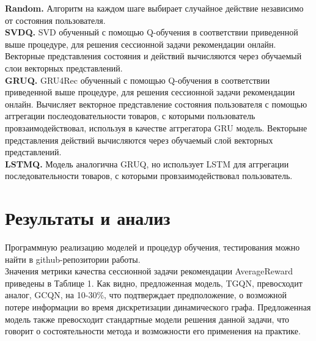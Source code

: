 \documentclass[a4paper,14pt,oneside]{mipt-thesis-ms}
\begin{document}
{\bf Random.} Алгоритм на каждом шаге выбирает случайное действие независимо от состояния пользователя.\\

{\bf SVDQ\cite{zhang01}.} SVD обученный с помощью Q-обучения в соответствии приведенной выше процедуре, для решения сессионной задачи рекомендации онлайн. Векторные представления состояния и действий вычисляются через обучаемый слои векторных представлений.\\

{\bf GRUQ\cite{hidasi01}.} GRU4Rec обученный с помощью Q-обучения в соответствии приведенной выше процедуре, для решения сессионной задачи рекомендации онлайн. Вычисляет векторное представление состояния пользователя с помощью аггрегации послеодовательности товаров, с которыми пользователь провзаимодействовал, используя в качестве аггрегатора GRU модель. Векторыне представления действий вычисляются через обучаемый слой векторных представлений.\\

{\bf LSTMQ.} Модель аналогична GRUQ, но использует LSTM для аггрегации последовательности товаров, с которыми провзаимодействовал пользователь.\\


\section{Результаты и анализ}
Программную реализацию моделей и процедур обучения, тестирования можно найти в github-репозитории работы\cite{github01}.
\\

Значения метрики качества сессионной задачи рекомендации AverageReward приведены в Таблице 1. Как видно, предложенная
модель, TGQN, превосходит аналог, GCQN, на 10-30\%, что подтверждает предположение, о возможной потере информации во время дискретизации динамического графа. Предложенная модель также превосходит стандартные модели решения данной задачи, что говорит о состоятельности метода и возможности его применения на практике.\\
\end{document}
